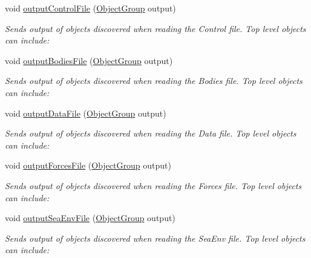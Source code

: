 \begin{DoxyCompactItemize}
\item 
void \hyperlink{classosea_1_1_file_reader_a705af41cd541f983951b6988082c632c}{output\-Control\-File} (\hyperlink{classosea_1_1_object_group}{Object\-Group} output)
\begin{DoxyCompactList}\small\item\em Sends output of objects discovered when reading the Control file. Top level objects can include\-: \end{DoxyCompactList}\item 
void \hyperlink{classosea_1_1_file_reader_a79f10f1fd00fac75e83152980e34a6ea}{output\-Bodies\-File} (\hyperlink{classosea_1_1_object_group}{Object\-Group} output)
\begin{DoxyCompactList}\small\item\em Sends output of objects discovered when reading the Bodies file. Top level objects can include\-: \end{DoxyCompactList}\item 
void \hyperlink{classosea_1_1_file_reader_a7f061059a96d02e453890e3b6874c17c}{output\-Data\-File} (\hyperlink{classosea_1_1_object_group}{Object\-Group} output)
\begin{DoxyCompactList}\small\item\em Sends output of objects discovered when reading the Data file. Top level objects can include\-: \end{DoxyCompactList}\item 
void \hyperlink{classosea_1_1_file_reader_a02f58d7d0c309a7de4599d5220c3ac65}{output\-Forces\-File} (\hyperlink{classosea_1_1_object_group}{Object\-Group} output)
\begin{DoxyCompactList}\small\item\em Sends output of objects discovered when reading the Forces file. Top level objects can include\-: \end{DoxyCompactList}\item 
void \hyperlink{classosea_1_1_file_reader_a25198e57b3c7f8fbca043ecce848d008}{output\-Sea\-Env\-File} (\hyperlink{classosea_1_1_object_group}{Object\-Group} output)
\begin{DoxyCompactList}\small\item\em Sends output of objects discovered when reading the Sea\-Env file. Top level objects can include\-: \end{DoxyCompactList}\end{DoxyCompactItemize}
